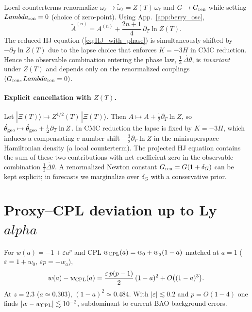 \documentclass[aps,prd,twocolumn,amsmath,amssymb,nofootinbib,superscriptaddress]{revtex4-2}
\def\mathcal#1{#1}%
\def\Lambda{Lambda}%
\def\alpha{alpha}\def\beta{beta}\def\gamma{gamma}%
\begin{document}
Local counterterms renormalize $\omega_\ell\to \tilde\omega_\ell=Z(T)\,\omega_\ell$ and $G\to G_{\rm ren}$ while setting $\Lambda_{\rm ren}=0$ (choice of zero-point).
Using App.~\ref{app:berry_osc},
\begin{equation}
\tilde{\mathcal A}^{(n)}=\mathcal A^{(n)}+\frac{2n+1}{4}\,\partial_T\ln Z(T).
\end{equation}
The reduced HJ equation (\ref{eq:HJ_with_phase}) is simultaneously shifted by $-\partial_T\ln Z(T)$ due to the lapse choice that enforces $K=-3H$ in CMC reduction.
Hence the observable combination entering the phase law,
$\tfrac13\,\dot{\Delta\theta}$, is \emph{invariant} under $Z(T)$ and depends only on the renormalized couplings $(G_{\rm ren},\Lambda_{\rm ren}=0)$.

\paragraph*{Explicit cancellation with $Z(T)$.}
Let $|\Xi(T)\rangle\mapsto Z^{1/2}(T)\,|\Xi(T)\rangle$.
Then $\mathcal A\mapsto \mathcal A+\tfrac{1}{2}\partial_T\ln Z$, so $\dot\theta_{\rm geo}\mapsto \dot\theta_{\rm geo}+\tfrac{1}{2}\partial_T\ln Z$.
In CMC reduction the lapse is fixed by $K=-3H$, which induces a compensating c-number shift $-\tfrac{3}{2}\partial_T\ln Z$ in the minisuperspace Hamiltonian density (a local counterterm).
The projected HJ equation contains the sum of these two contributions with net coefficient zero in the observable combination $\tfrac{1}{3}\dot{\Delta\theta}$.
A renormalized Newton constant $G_{\rm ren}=G(1+\delta_G)$ can be kept explicit; in forecasts we marginalize over $\delta_G$ with a conservative prior.

\section{Proxy--CPL deviation up to Ly$\alpha$}
\label{app:proxy_smallness}

For $w(a)=-1+\varepsilon a^p$ and CPL $w_{\rm CPL}(a)=w_0+w_a(1-a)$ matched at $a=1$ ($\varepsilon=1+w_0$, $\varepsilon p=-w_a$),
\begin{equation}
w(a)-w_{\rm CPL}(a)=\frac{\varepsilon\,p(p-1)}{2}\,(1-a)^2+\mathcal O\big((1-a)^3\big).
\end{equation}
At $z=2.3$ ($a\simeq 0.303$), $(1-a)^2\simeq 0.484$. With $|\varepsilon|\lesssim 0.2$ and $p=\mathcal O(1\!-\!4)$ one finds $|w-w_{\rm CPL}|\lesssim 10^{-2}$, subdominant to current BAO background errors.
\end{document}
